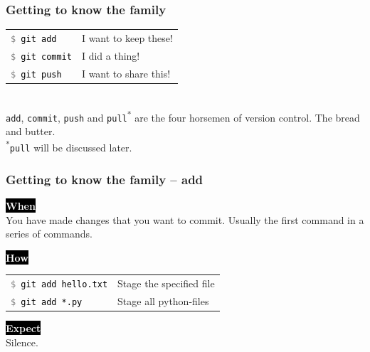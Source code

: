 \documentclass{beamer}
\newcommand{\keyword}[1]{\hspace{-1.0em}\colorbox{black}{\textcolor{white}{\textbf{#1}\vphantom{Ep}}}\vspace{0.2em}} %
\newcommand{\command}[1]{\colorbox{black!90!white!10!}{\vphantom{Ep}\texttt{\textcolor{gray}{\$} \textcolor{black}{#1}}}}
\begin{document}
\begin{frame}[fragile]
  \frametitle{Getting to know the family}

  \begin{tabular}{ll}
    \command{git add} & I want to keep these! \\
    \command{git commit} & I did a thing! \\
    \command{git push} & I want to share this! \\ %
  \end{tabular}
  \\ [2.0em]

  \texttt{add}, \texttt{commit}, \texttt{push} and \texttt{pull}\textsuperscript{*}
  are the four horsemen of version control. The bread and butter.
  \\ [2.0em]

  \small \textsuperscript{*}\texttt{pull} will be discussed later.

  \vspace{2em}

  \tikzset{->,        %
           >=stealth  %
  }


\end{frame}

\begin{frame}
  \frametitle{Getting to know the family -- add}
  \keyword{When}\\
    You have made changes that you want to commit.
    Usually the first command in a series of commands.
  \vspace{0.5em}

  \keyword{How}\\
  \hspace{-0.95em}
  \begin{tabular}{ll}
    \command{git add hello.txt} & Stage the specified file \\
    \command{git add *.py} & Stage all python-files \\
  \end{tabular}
  \vspace{0.5em}

  \keyword{Expect}\\
  Silence.
\end{frame}
\end{document}
